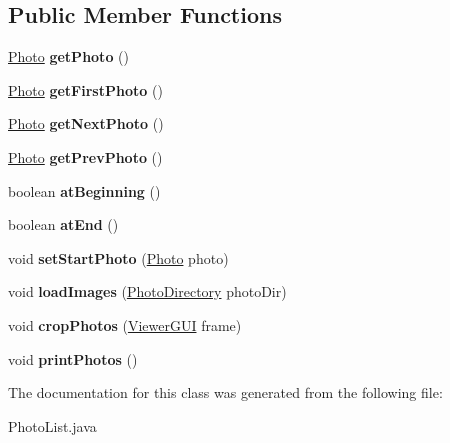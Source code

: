 \subsection*{Public Member Functions}
\begin{DoxyCompactItemize}
\item 
\hypertarget{class_photo_list_ae628386e5f7f4674fc3426ff1b093c26}{\hyperlink{class_photo}{Photo} {\bfseries get\-Photo} ()}\label{class_photo_list_ae628386e5f7f4674fc3426ff1b093c26}

\item 
\hypertarget{class_photo_list_ac03d1e4822c26e086d9f6579be8f569f}{\hyperlink{class_photo}{Photo} {\bfseries get\-First\-Photo} ()}\label{class_photo_list_ac03d1e4822c26e086d9f6579be8f569f}

\item 
\hypertarget{class_photo_list_a9ca62869a8b779bd7fedad12362127e8}{\hyperlink{class_photo}{Photo} {\bfseries get\-Next\-Photo} ()}\label{class_photo_list_a9ca62869a8b779bd7fedad12362127e8}

\item 
\hypertarget{class_photo_list_afd0bcbf4fd13fa2a8408a649d56c6c8d}{\hyperlink{class_photo}{Photo} {\bfseries get\-Prev\-Photo} ()}\label{class_photo_list_afd0bcbf4fd13fa2a8408a649d56c6c8d}

\item 
\hypertarget{class_photo_list_ad1fe39413e463e258fc7cff2fcc7495e}{boolean {\bfseries at\-Beginning} ()}\label{class_photo_list_ad1fe39413e463e258fc7cff2fcc7495e}

\item 
\hypertarget{class_photo_list_a53fc4e93a8da830f3e8181e6853a22fa}{boolean {\bfseries at\-End} ()}\label{class_photo_list_a53fc4e93a8da830f3e8181e6853a22fa}

\item 
\hypertarget{class_photo_list_aa90131f591a2bc298254830b729ae82a}{void {\bfseries set\-Start\-Photo} (\hyperlink{class_photo}{Photo} photo)}\label{class_photo_list_aa90131f591a2bc298254830b729ae82a}

\item 
\hypertarget{class_photo_list_a63cf56455a46cdeb64ebfcb4797cfa01}{void {\bfseries load\-Images} (\hyperlink{class_photo_directory}{Photo\-Directory} photo\-Dir)}\label{class_photo_list_a63cf56455a46cdeb64ebfcb4797cfa01}

\item 
\hypertarget{class_photo_list_a4af932149cf1650bb5760a0c13d761f2}{void {\bfseries crop\-Photos} (\hyperlink{class_viewer_g_u_i}{Viewer\-G\-U\-I} frame)}\label{class_photo_list_a4af932149cf1650bb5760a0c13d761f2}

\item 
\hypertarget{class_photo_list_ab9c38b41e3a6d93bf524bc63fc254ea5}{void {\bfseries print\-Photos} ()}\label{class_photo_list_ab9c38b41e3a6d93bf524bc63fc254ea5}

\end{DoxyCompactItemize}


The documentation for this class was generated from the following file\-:\begin{DoxyCompactItemize}
\item 
Photo\-List.\-java\end{DoxyCompactItemize}
